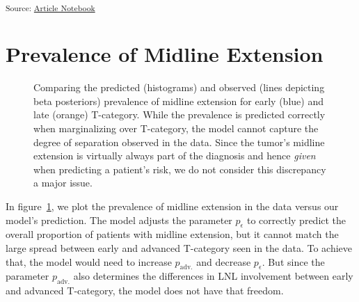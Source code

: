 \documentclass[
  sn-mathphys-num,
]{sn-jnl}
\begin{document}
\textsubscript{Source:
\href{https://rmnldwg.github.io/bilateral-paper/manuscript.qmd.html}{Article
Notebook}}

\section{Prevalence of Midline Extension}\label{sec-prevalence-midext}

\begin{figure}


\caption{\label{fig-model-prevalences-midext}Comparing the predicted
(histograms) and observed (lines depicting beta posteriors) prevalence
of midline extension for early (blue) and late (orange) T-category.
While the prevalence is predicted correctly when marginalizing over
T-category, the model cannot capture the degree of separation observed
in the data. Since the tumor's midline extension is virtually always
part of the diagnosis and hence \emph{given} when predicting a patient's
risk, we do not consider this discrepancy a major issue.}

\end{figure}%

In figure~\ref{fig-model-prevalences-midext}, we plot the prevalence of
midline extension in the data versus our model's prediction. The model
adjusts the parameter \(p_\epsilon\) to correctly predict the overall
proportion of patients with midline extension, but it cannot match the
large spread between early and advanced T-category seen in the data. To
achieve that, the model would need to increase \(p_\text{adv.}\) and
decrease \(p_\epsilon\). But since the parameter \(p_\text{adv.}\) also
determines the differences in LNL involvement between early and advanced
T-category, the model does not have that freedom.
\end{document}
